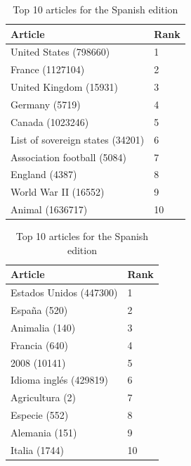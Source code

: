 \begin{table}[htbp]
    \begin{minipage}{.45\linewidth}
        \centering
        \begin{tabular}{ll}
            \toprule
            Article & Rank\\
            \midrule
            United States (798660) & 1\\
            France (1127104) & 2\\
            United Kingdom (15931) & 3\\
            Germany (5719) & 4\\
            Canada (1023246) & 5\\
            List of sovereign states (34201) & 6\\
            Association football (5084) & 7\\
            England (4387) & 8\\
            World War II (16552) & 9\\
            Animal (1636717) & 10\\
            \bottomrule
        \end{tabular}
        \caption{Top 10 articles for the English edition}
    \end{minipage}
    \hfill
    \begin{minipage}{.45\linewidth}
        \centering
        \begin{tabular}{ll}
            \toprule
            Article & Rank\\
            \midrule
            Estados Unidos (447300) & 1\\
            España (520) & 2\\
            Animalia (140) & 3\\
            Francia (640) & 4\\
            2008 (10141) & 5\\
            Idioma inglés (429819) & 6\\
            Agricultura (2) & 7\\
            Especie (552) & 8\\
            Alemania (151) & 9\\
            Italia (1744) & 10\\
            \bottomrule
        \end{tabular}
        \caption{Top 10 articles for the Spanish edition}
    \end{minipage}
\end{table}

